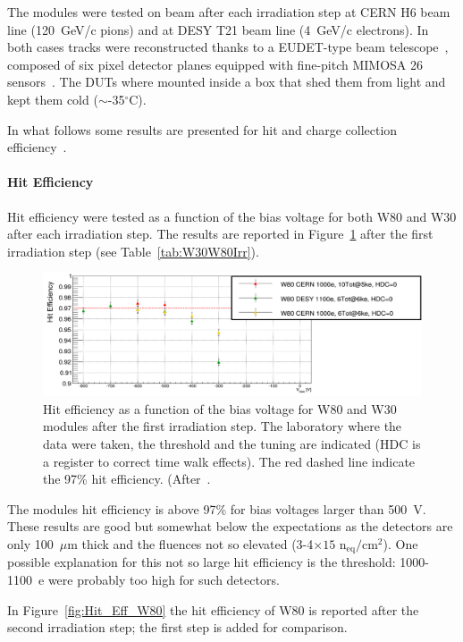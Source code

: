 The modules were tested on beam after each irradiation step at CERN H6 beam line (120~GeV/c pions) and at DESY T21 beam line (4~GeV/c electrons).
 In both cases tracks were reconstructed thanks to  a EUDET-type beam telescope~\cite{Jansen2016}, 
 composed of six pixel detector planes equipped with fine-pitch MIMOSA 26 sensors~\cite{mimosa26}. 
 The DUTs where mounted inside a box that shed them from light and kept them cold 
 ($\sim$-35$^{\circ}$C).
 
 In what follows some results are presented for hit and charge collection efficiency~\cite{TrentoWS2017,AudreyPSD11}.


\paragraph{Hit Efficiency}
Hit efficiency were tested as a function of the bias voltage for both W80 and W30 after each irradiation 
step. 
The results are reported in Figure~\ref{fig:HitEffW80W30} after the first irradiation step
(see Table~\ref{tab:W30W80Irr}).

\begin{figure}[!htpb]
\centering
\includegraphics[width=1.0\textwidth]{ZoomHitEffLowFl.pdf}
\caption{\label{fig:HitEffW80W30}Hit efficiency as a function of the bias voltage for W80 and W30 modules 
after the first irradiation step. The laboratory where the data were taken, the threshold and the tuning 
are indicated (HDC is a register to correct time walk effects). The red dashed line indicate the 97\% 
hit efficiency. (After~\cite{TrentoWS2017}.}
\end{figure}

The modules hit efficiency is above 97\% for bias voltages larger than 500~V. These results are good 
but somewhat below the expectations as the detectors are only 100~$\mu$m thick and the fluences 
not so elevated (3-4$\times{15}$ n$_\text{eq}/\text{cm}^2$). One possible explanation for this not 
so large hit efficiency is the threshold: 1000-1100~e were probably too high for such detectors. 

In Figure~\ref{fig:Hit_Eff_W80} the hit efficiency of W80 is reported after the second irradiation step; 
the first step is added for comparison.

